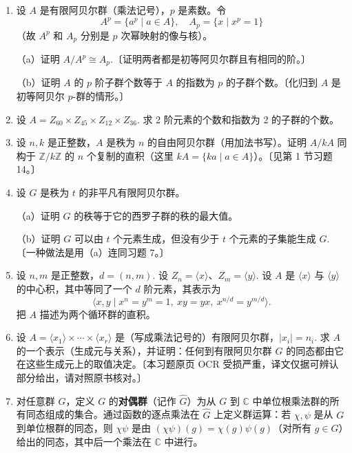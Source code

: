 \begin{enumerate}
（b）用给定的生成元描述 \(\varphi\) 的像与核。

（c）证明 \(\ker \varphi\) 与 \(A/\operatorname{im}(\varphi)\) 都有秩 \(n\)（即与 \(A\) 有相同的秩），并证明这两个群都同构于 \(p^n\) 阶初等阿贝尔群 \(E_{p^n}\).

\item 设 \(A\) 是有限阿贝尔群（乘法记号），\(p\) 是素数。令
\[
A^p = \{a^p \mid a \in A\}, \quad A_p = \{x \mid x^p = 1\}
\]
（故 \(A^p\) 和 \(A_p\) 分别是 \(p\) 次幂映射的像与核）。

（a）证明 \(A/A^p \cong A_p\).〔证明两者都是初等阿贝尔群且有相同的阶。〕

（b）证明 \(A\) 的 \(p\) 阶子群个数等于 \(A\) 的指数为 \(p\) 的子群个数。〔化归到 \(A\) 是初等阿贝尔 \(p\)-群的情形。〕

\item 设 \(A = Z_{60} \times Z_{45} \times Z_{12} \times Z_{36}\). 求 2 阶元素的个数和指数为 2 的子群的个数。

\item 设 \(n, k\) 是正整数，\(A\) 是秩为 \(n\) 的自由阿贝尔群（用加法书写）。证明 \(A/kA\) 同构于 \(\mathbb{Z}/k\mathbb{Z}\) 的 \(n\) 个复制的直积（这里 \(kA = \{ka \mid a \in A\}\)）。〔见第 1 节习题 14。〕

\item 设 \(G\) 是秩为 \(t\) 的非平凡有限阿贝尔群。

（a）证明 \(G\) 的秩等于它的西罗子群的秩的最大值。

（b）证明 \(G\) 可以由 \(t\) 个元素生成，但没有少于 \(t\) 个元素的子集能生成 \(G\).〔一种做法是用（a）连同习题 7。〕

\item 设 \(n, m\) 是正整数，\(d = (n, m)\). 设 \(Z_n = \langle x \rangle\)、\(Z_m = \langle y \rangle\). 设 \(A\) 是 \(\langle x \rangle\) 与 \(\langle y \rangle\) 的中心积，其中等同了一个 \(d\) 阶元素，其表示为
\[
\langle x, y \mid x^n = y^m = 1,\ xy = yx,\ x^{n/d} = y^{m/d} \rangle.
\]
把 \(A\) 描述为两个循环群的直积。

\item 设 \(A = \langle x_1 \rangle \times \cdots \times \langle x_r \rangle\) 是（写成乘法记号的）有限阿贝尔群，\(|x_i| = n_i\). 求 \(A\) 的一个表示（生成元与关系），并证明：任何到有限阿贝尔群 \(G\) 的同态都由它在这些生成元上的取值决定。〔本习题原页 OCR 受损严重，译文仅据可辨认部分给出，请对照原书核对。〕

\item 对任意群 \(G\)，定义 \(G\) 的\textbf{对偶群}（记作 \(\hat{G}\)）为从 \(G\) 到 \(\mathbb{C}\) 中单位根乘法群的所有同态组成的集合。通过函数的逐点乘法在 \(\hat{G}\) 上定义群运算：若 \(\chi, \psi\) 是从 \(G\) 到单位根群的同态，则 \(\chi\psi\) 是由 \((\chi\psi)(g) = \chi(g)\psi(g)\)（对所有 \(g \in G\)）给出的同态，其中后一个乘法在 \(\mathbb{C}\) 中进行。


\end{enumerate}
